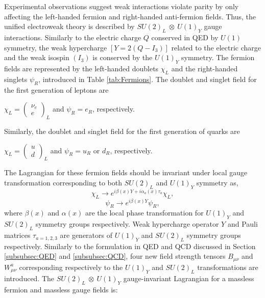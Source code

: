 Experimental observations suggest weak interactions violate parity by only affecting the left-handed fermion and right-handed anti-fermion fields. Thus, the unified electroweak theory is described by $SU(2)_{L}~\otimes~U(1)_{Y}$ gauge interactions. Similarly to the electric charge $Q$ conserved in QED by $U(1)$ symmetry, the weak hypercharge $[Y=2(Q-I_{3})]$ related to the electric charge and the weak isospin $(I_{3})$ is conserved by the $U(1)_{Y}$ symmetry. The fermion fields are represented by the left-handed doublets $\chi_{L}$ and the right-handed singlets $\psi_{R}$, introduced in Table \ref{tab:Fermions}. The doublet and singlet field for the first generation of leptons are
\begin{center}
$\chi_{L} = \begin{pmatrix} \nu_{e} \\ e\end{pmatrix}_{L}$  \hspace{5pt} and \hspace{5pt} $ \psi_{R} = e_{R}$, respectively. 
\end{center}
Similarly, the doublet and singlet field for the first generation of quarks are 
\begin{center}
\hspace{15pt}$\chi_{L} = \begin{pmatrix}  u \\ d \end{pmatrix}_{L}$ \hspace{10pt} and \hspace{5pt} $ \psi_{R} = u_{R}$ or $d_{R}$, respectively.  
\end{center}
The Lagrangian for these fermion fields should be invariant under local gauge transformation corresponding to both $SU(2)_{L}$ and $U(1)_{Y}$ symmetry as, 
\begin{equation}
\chi_{L} \rightarrow e^{i\beta(x)Y+i\alpha_{a}(x)\tau_{a}} \chi_{L},
\label{eqn:SU2LHTransform}
\end{equation}
\begin{equation}
\psi_{R} \rightarrow e^{i\beta(x)Y} \psi_{R},
\label{eqn:SU2RHTransform}
\end{equation}
where $\beta(x)$ and $\alpha(x)$ are the local phase transformation for $U(1)_{Y}$ and $SU(2)_{L}$ symmetry groups respectively. Weak hypercharge operator $Y$ and Pauli matrices $\tau_{a=1,2,3}$ are generators of $U(1)_{Y}$ and $SU(2)_{L}$ symmetry groups respectively. Similarly to the formulation in QED and QCD discussed in Section \ref{subsubsec:QED} and \ref{subsubsec:QCD}, four new field strength tensors $B_{\mu\nu}$ and $W^{a}_{\mu\nu}$ corresponding respectively to the $U(1)_{Y}$ and $SU(2)_{L}$ transformations are introduced. The  $SU(2)_{L}~\otimes~U(1)_{Y}$ gauge-invariant Lagrangian for a massless fermion and massless gauge fields is:
